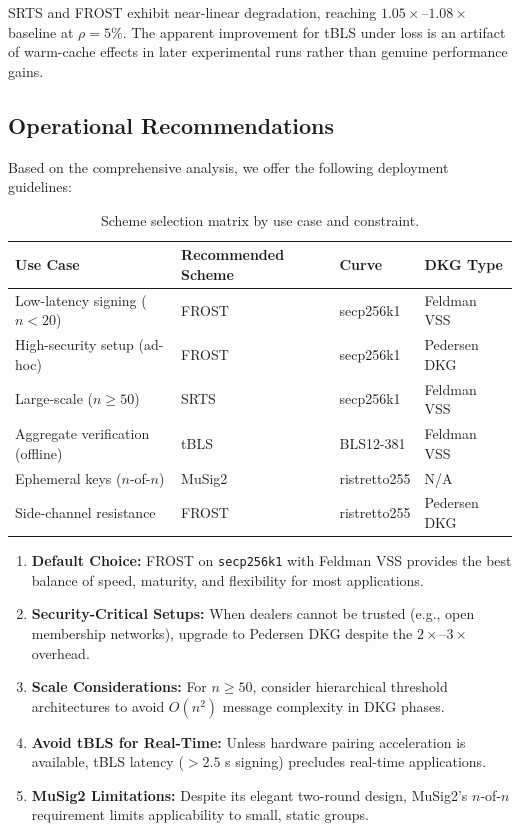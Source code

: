 SRTS and FROST exhibit near-linear degradation, reaching $1.05\times$--$1.08\times$ baseline at $\rho=5\%$. The apparent improvement for tBLS under loss is an artifact of warm-cache effects in later experimental runs rather than genuine performance gains.

\subsection{Operational Recommendations}
\label{subsec:recommendations}

Based on the comprehensive analysis, we offer the following deployment guidelines:

\begin{table}[H]
\caption{Scheme selection matrix by use case and constraint.}
\label{tab:scheme_selection}
\centering
\begin{tabular}{llll}
\toprule
\textbf{Use Case} & \textbf{Recommended Scheme} & \textbf{Curve} & \textbf{DKG Type} \\
\midrule
Low-latency signing ($n < 20$) & FROST & secp256k1 & Feldman VSS \\
High-security setup (ad-hoc) & FROST & secp256k1 & Pedersen DKG \\
Large-scale ($n \geq 50$) & SRTS & secp256k1 & Feldman VSS \\
Aggregate verification (offline) & tBLS & BLS12-381 & Feldman VSS \\
Ephemeral keys ($n$-of-$n$) & MuSig2 & ristretto255 & N/A \\
Side-channel resistance & FROST & ristretto255 & Pedersen DKG \\
\bottomrule
\end{tabular}
\end{table}

\begin{enumerate}
    \item \textbf{Default Choice:} FROST on \texttt{secp256k1} with Feldman VSS provides the best balance of speed, maturity, and flexibility for most applications.
    
    \item \textbf{Security-Critical Setups:} When dealers cannot be trusted (e.g., open membership networks), upgrade to Pedersen DKG despite the $2\times$--$3\times$ overhead.
    
    \item \textbf{Scale Considerations:} For $n \geq 50$, consider hierarchical threshold architectures to avoid $O(n^2)$ message complexity in DKG phases.
    
    \item \textbf{Avoid tBLS for Real-Time:} Unless hardware pairing acceleration is available, tBLS latency ($>2.5$ s signing) precludes real-time applications.
    
    \item \textbf{MuSig2 Limitations:} Despite its elegant two-round design, MuSig2's $n$-of-$n$ requirement limits applicability to small, static groups.
\end{enumerate}

